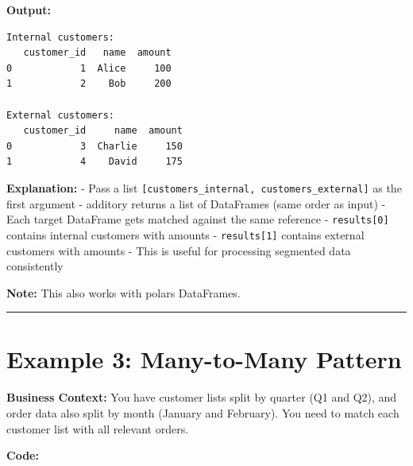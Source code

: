 \documentclass[
  letterpaper,
]{scrbook}
\begin{document}
\textbf{Output:}

\begin{verbatim}
Internal customers:
   customer_id   name  amount
0            1  Alice     100
1            2    Bob     200

External customers:
   customer_id     name  amount
0            3  Charlie     150
1            4    David     175
\end{verbatim}

\textbf{Explanation:} - Pass a list
\texttt{{[}customers\_internal,\ customers\_external{]}} as the first
argument - additory returns a list of DataFrames (same order as input) -
Each target DataFrame gets matched against the same reference -
\texttt{results{[}0{]}} contains internal customers with amounts -
\texttt{results{[}1{]}} contains external customers with amounts - This
is useful for processing segmented data consistently

\textbf{Note:} This also works with polars DataFrames.

\begin{center}\rule{0.5\linewidth}{0.5pt}\end{center}

\section{Example 3: Many-to-Many
Pattern}\label{example-3-many-to-many-pattern}

\textbf{Business Context:} You have customer lists split by quarter (Q1
and Q2), and order data also split by month (January and February). You
need to match each customer list with all relevant orders.

\textbf{Code:}
\end{document}
